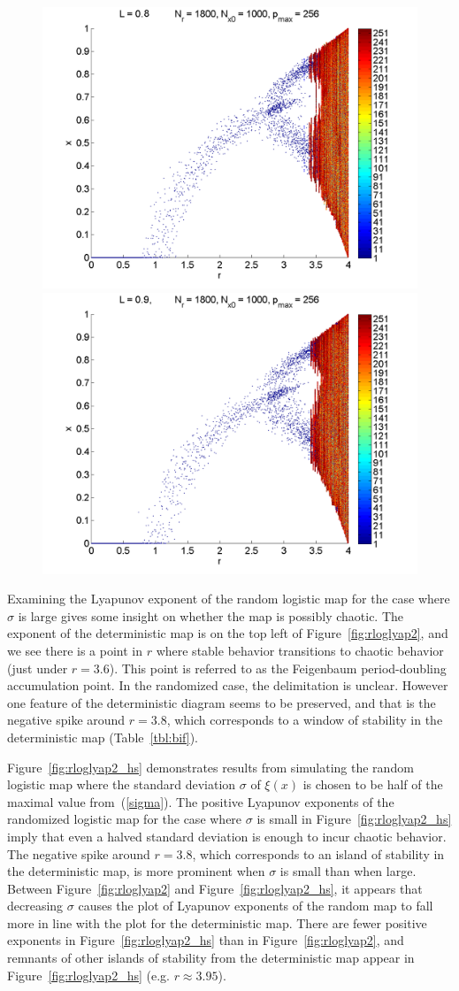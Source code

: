 \begin{figure}[H]
\begin{center}
		\includegraphics[width=.5\textwidth]{figs/rlog_bif_halfs_L_08.png}\hfill
		\includegraphics[width=.5\textwidth]{figs/rlog_bif_halfs_L_09.png}\\
	\end{center}
\end{figure}

Examining the Lyapunov exponent of the random logistic
map for the case where $\sigma$ is large gives some insight on whether
the map is possibly chaotic. The exponent of the deterministic map is
on the top left of Figure~\ref{fig:rloglyap2}, and we see there is a
point in $r$ where stable behavior transitions to chaotic behavior
(just under $r=3.6$). This point is referred to as the Feigenbaum
period-doubling accumulation point. In the randomized case, the
delimitation is unclear. However one feature of the deterministic
diagram seems to be preserved, and that is the negative spike around
$r=3.8$, which corresponds to a window of stability in the
deterministic map (Table~\ref{tbl:bif}).

Figure~\ref{fig:rloglyap2_hs}
demonstrates results from simulating the random logistic map where the
standard deviation $\sigma$ of $\xi(x)$ is chosen to be half of the maximal
value from~(\ref{sigma}). The positive Lyapunov exponents of the randomized logistic
map for the case where $\sigma$ is small in
Figure~\ref{fig:rloglyap2_hs} imply that even a halved standard
deviation is enough to incur chaotic behavior. The negative spike around
$r=3.8$, which corresponds to an island of stability in the
deterministic map, is more prominent when $\sigma$ is small than when large. Between
Figure~\ref{fig:rloglyap2} and Figure~\ref{fig:rloglyap2_hs}, it
appears that decreasing $\sigma$ causes the plot of Lyapunov exponents
of the random map to fall more in line with the plot for the
deterministic map. There are fewer positive exponents in
Figure~\ref{fig:rloglyap2_hs} than in Figure~\ref{fig:rloglyap2}, and
remnants of other islands of stability from the deterministic map
appear in Figure~\ref{fig:rloglyap2_hs} (e.g. $r \approx 3.95$).

